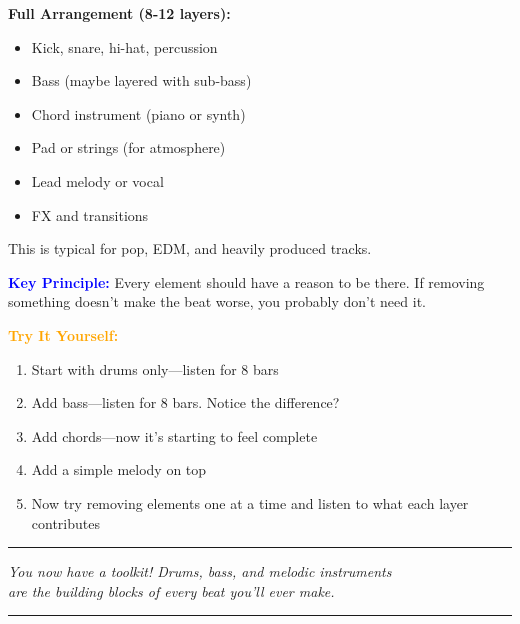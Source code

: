 \documentclass[11pt,letterpaper]{article}
\newcommand{\bluepurple}[1]{\textcolor{blue}{\textbf{#1}}}
\newcommand{\orangetext}[1]{\textcolor{orange}{\textbf{#1}}}
\begin{document}
\textbf{Full Arrangement (8-12 layers):}
\begin{itemize}[leftmargin=*]
\item Kick, snare, hi-hat, percussion
\item Bass (maybe layered with sub-bass)
\item Chord instrument (piano or synth)
\item Pad or strings (for atmosphere)
\item Lead melody or vocal
\item FX and transitions
\end{itemize}

This is typical for pop, EDM, and heavily produced tracks.

\textbf{\bluepurple{Key Principle:}} Every element should have a reason to be there. If removing something doesn't make the beat worse, you probably don't need it.

\textbf{\orangetext{Try It Yourself:}}

\begin{enumerate}[leftmargin=*]
\item Start with drums only—listen for 8 bars
\item Add bass—listen for 8 bars. Notice the difference?
\item Add chords—now it's starting to feel complete
\item Add a simple melody on top
\item Now try removing elements one at a time and listen to what each layer contributes
\end{enumerate}

\begin{center}
\rule{0.6\textwidth}{0.5pt}

\vspace{0.3cm}

\textit{You now have a toolkit! Drums, bass, and melodic instruments \\
are the building blocks of every beat you'll ever make.}

\vspace{0.3cm}

\rule{0.6\textwidth}{0.5pt}
\end{center}

\newpage

\end{document}
